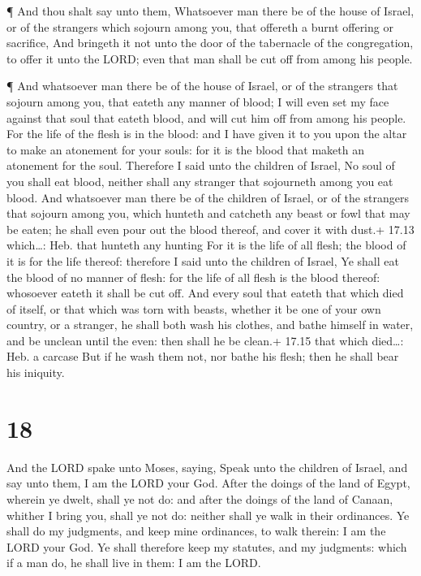 ¶ And thou shalt say unto them, Whatsoever man there be of
the house of Israel, or of the strangers which sojourn among you, that
offereth a burnt offering or sacrifice,  And bringeth it not
unto the door of the tabernacle of the congregation, to offer it unto
the LORD; even that man shall be cut off from among his people.

 ¶ And whatsoever man there be of the house of Israel, or
of the strangers that sojourn among you, that eateth any manner of
blood; I will even set my face against that soul that eateth blood, and
will cut him off from among his people.  For the life of
the flesh is in the blood: and I have given it to you upon the altar to
make an atonement for your souls: for it is the blood that maketh an
atonement for the soul.  Therefore I said unto the children
of Israel, No soul of you shall eat blood, neither shall any stranger
that sojourneth among you eat blood.  And whatsoever man
there be of the children of Israel, or of the strangers that sojourn
among you, which hunteth and catcheth any beast or fowl that may be
eaten; he shall even pour out the blood thereof, and cover it with
dust.+ 17.13 which\ldots: Heb. that hunteth any hunting 
For it is the life of all flesh; the blood of it is for the life
thereof: therefore I said unto the children of Israel, Ye shall eat the
blood of no manner of flesh: for the life of all flesh is the blood
thereof: whosoever eateth it shall be cut off.  And every
soul that eateth that which died of itself, or that which was torn with
beasts, whether it be one of your own country, or a stranger, he shall
both wash his clothes, and bathe himself in water, and be unclean until
the even: then shall he be clean.+ 17.15 that which died\ldots: Heb. a
carcase  But if he wash them not, nor bathe his flesh; then
he shall bear his iniquity.

\hypertarget{section-17}{%
\section{18}\label{section-17}}

 And the LORD spake unto Moses, saying,  Speak
unto the children of Israel, and say unto them, I am the LORD your God.
 After the doings of the land of Egypt, wherein ye dwelt,
shall ye not do: and after the doings of the land of Canaan, whither I
bring you, shall ye not do: neither shall ye walk in their ordinances.
 Ye shall do my judgments, and keep mine ordinances, to walk
therein: I am the LORD your God.  Ye shall therefore keep my
statutes, and my judgments: which if a man do, he shall live in them: I
am the LORD.

